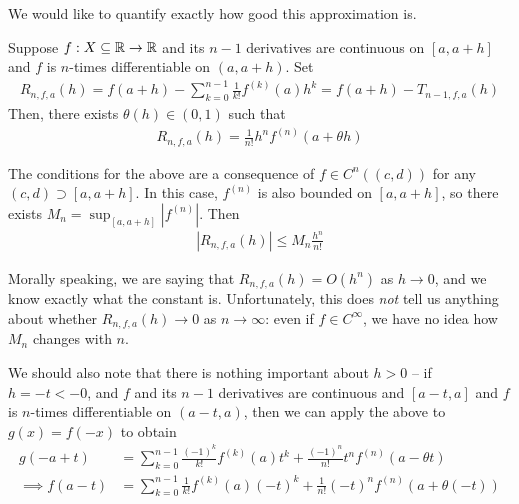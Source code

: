 \documentclass{../../template/note}
\begin{document}
    We would like to quantify exactly how good this approximation is.

    \begin{theorem}
        \label{taylor-lagrange}
        Suppose \(f: X \subseteq \mathbb R \to \mathbb R\) and its \(n-1\) derivatives are continuous on \([a, a+h]\) and \(f\) is \(n\)-times differentiable on \((a, a+h)\). Set
        \begin{align*}
            R_{n, f, a}(h) = f(a+h) - \sum_{k=0}^{n-1} \frac 1 {k!} f^{(k)}(a) h^k = f(a+h) - T_{n-1, f, a}(h)
        \end{align*}
        Then, there exists \(\theta(h) \in (0, 1)\) such that
        \begin{align*}
            R_{n, f, a}(h) = \frac 1 {n!} h^n f^{(n)}(a+\theta h) 
        \end{align*}
    \end{theorem}
    
    \begin{remark*}
        The conditions for the above are a consequence of \(f \in C^n((c, d))\) for any \((c, d) \supset [a, a+h]\). In this case, \(f^{(n)}\) is also bounded on \([a, a+h]\), so there exists \(M_n = \sup_{[a, a+h]}|f^{(n)}|\). Then
        \begin{align*}
            |R_{n,f,a}(h)| \leq M_n \frac{h^n}{n!}
        \end{align*}
    \end{remark*}

    Morally speaking, we are saying that \(R_{n, f, a}(h) = O(h^n)\) as \(h \to 0\), and we know exactly what the constant is. Unfortunately, this does \emph{not} tell us anything about whether \(R_{n, f, a}(h) \to 0\) as \(n \to \infty\): even if \(f \in C^\infty\), we have no idea how \(M_n\) changes with \(n\).

    \begin{remark*}
        We should also note that there is nothing important about \(h > 0\) -- if \(h = -t < -0\), and \(f\) and its \(n-1\) derivatives are continuous and \([a-t, a]\) and \(f\) is \(n\)-times differentiable on \((a-t, a)\), then we can apply the above to \(g(x) = f(-x)\) to obtain
        \begin{align*}
            g(-a+t) &= \sum_{k=0}^{n-1} \frac{(-1)^k}{k!} f^{(k)}(a) t^k + \frac{(-1)^n}{n!}t^n f^{(n)}(a-\theta t) \\
            \implies f(a-t) &= \sum_{k=0}^{n-1} \frac{1}{k!} f^{(k)}(a)(-t)^k + \frac{1}{n!}(-t)^n f^{(n)}(a+\theta(-t))
        \end{align*}
    \end{remark*}
    
\end{document}
